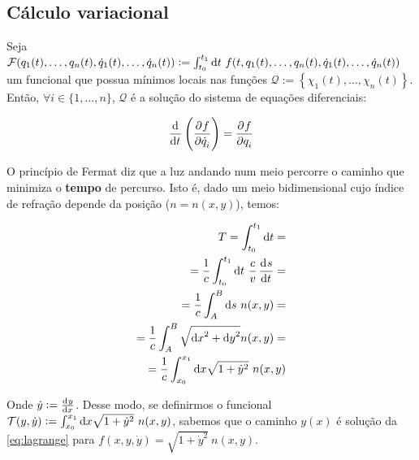 \subsection{Cálculo variacional}
\label{ssec:variational_calculus}

Seja $\mathcal{F}(q_1(t), \ldots, q_n(t), \dot q_1(t), \ldots, \dot q_n(t)) :=
\int_{t_0}^{t_1} \dif t~f(t, q_1(t), \ldots, q_n(t), \dot q_1(t), \ldots, \dot
q_n(t))$  um funcional que possua mínimos locais nas funções $\mathcal{Q} :=
\left\{\chi_1(t), \ldots, \chi_n(t) \right\}$. Então, $\forall i \in \{1,
\ldots,  n\}$, $\mathcal{Q}$ é a solução do sistema de equações diferenciais:

\begin{equation}
    \label{eq:lagrange}
    \dod{}{t} \del{ \dpd{f}{\dot q_i} } = \dpd{f}{q_i}
\end{equation}

\begin{eg}
    \label{eg:fermat}
    O princípio de Fermat diz que a luz andando num meio percorre o caminho que
    minimiza o \textbf{tempo} de percurso. Isto é, dado um meio bidimensional
    cujo índice de refração depende da posição ($n = n(x,y)$), temos:

    \begin{equation}
        \begin{aligned}
        T = \int_{t_0}^{t_1} \dif t =&  \\
        = \frac{1}{c} \int_{t_0}^{t_1} \dif t~\frac{c}{v} \dod{s}{t} =& \\
        = \frac{1}{c} \int_{A}^{B} \dif s~n(x,y)  =& \\
        = \frac{1}{c} \int_{A}^{B} \sqrt{{\dif x}^2 + {\dif y}^2} n(x,y) =& \\
        = \frac{1}{c} \int_{x_0}^{x_1} \dif x \sqrt{1 + {\dot y}^2} ~ n(x,y) 
        \end{aligned}
    \end{equation}

    Onde $\dot y := \tod{y}{x}$. Desse modo, se definirmos o funcional
    $\mathcal{T}(y, \dot y) := \int_{x_0}^{x_1} \dif x \sqrt{1 + {\dot y}^2} ~
    n(x,y)$,  sabemos que o caminho $y(x)$ é solução da \autoref{eq:lagrange}
    para $f(x, y, \dot y) = \sqrt{1 + {\dot y}^2}~n(x,y)$.
\end{eg}


